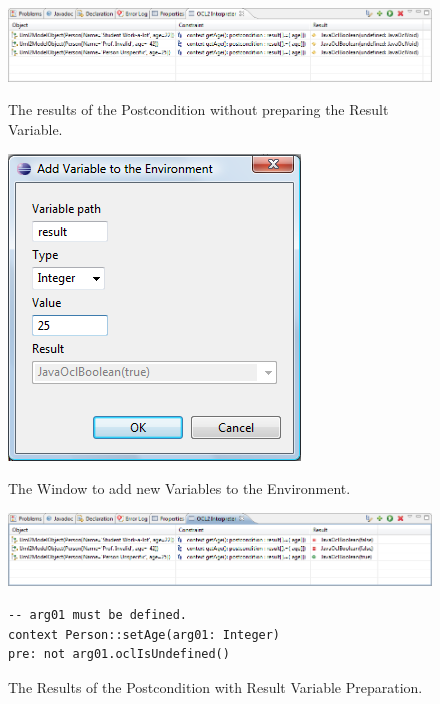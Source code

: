 \begin{figure}[!p]
	\centering
	\includegraphics[width=1.0\linewidth]{figures/interpreter/interpret08}
	\caption{The results of the Postcondition without preparing the Result Variable.}
	\label{pic:interpret:interpret08}

  \vspace{3.0em}
	
	\centering
	\includegraphics[width=0.4\linewidth]{figures/interpreter/interpret09}
	\caption{The Window to add new Variables to the Environment.}
	\label{pic:interpret:interpret09}

  \vspace{3.0em}
	
	\centering
	\includegraphics[width=1.0\linewidth]{figures/interpreter/interpret10}
	\caption{The Results of the Postcondition with Result Variable Preparation.}
	\label{pic:interpret:interpret10}
	
  \vspace{3.0em}

  \lstset{
    language=OCL
  }
  \begin{lstlisting}[caption={An example Precondition defined on an Operation with Argument.}, captionpos=b, label=lst:interpret:precondition]
-- arg01 must be defined.
context Person::setAge(arg01: Integer)
pre: not arg01.oclIsUndefined()
  \end{lstlisting}
\end{figure}

